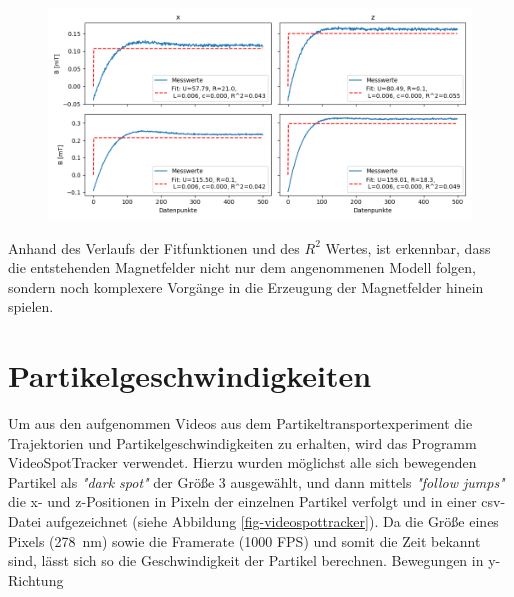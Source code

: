 \documentclass[page,pdftex,12pt,a4paper,twoside,openright]{scrbook}
\begin{document}
\begin{figure}[h]
\centering
\includegraphics[width=\textwidth]{img/mag_fit.png}
\label{fig-mag_fit}
\end{figure}

Anhand des Verlaufs der Fitfunktionen und des \(R^2\) Wertes, ist erkennbar, dass die entstehenden Magnetfelder nicht nur dem angenommenen Modell folgen, sondern noch komplexere Vorgänge in die Erzeugung der Magnetfelder hinein spielen.
\section{Partikelgeschwindigkeiten \label{sec-partikelgeschwindigkeiten}}
\label{sec:org9757643}
Um aus den aufgenommen Videos aus dem Partikeltransportexperiment die Trajektorien und Partikelgeschwindigkeiten zu erhalten, wird das Programm VideoSpotTracker verwendet. Hierzu wurden möglichst alle sich bewegenden Partikel als \emph{"dark spot"} der Größe \(3\) ausgewählt, und dann mittels \emph{"follow jumps"} die x- und z-Positionen in Pixeln der einzelnen Partikel verfolgt und in einer csv-Datei aufgezeichnet (siehe Abbildung \ref{fig-videospottracker}). Da die Größe eines Pixels (\SI{278}{\nano\meter}) sowie die Framerate (1000 FPS) und somit die Zeit bekannt sind, lässt sich so die Geschwindigkeit der Partikel berechnen. Bewegungen in y-Richtung
\end{document}
